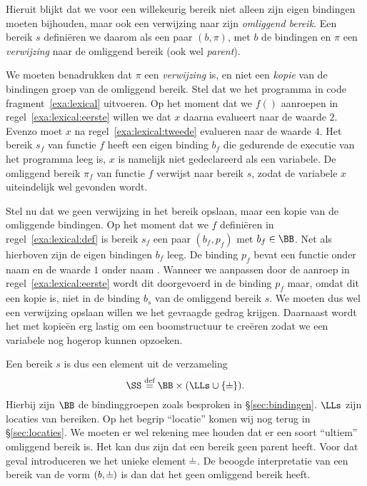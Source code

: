Hieruit blijkt dat we voor een willekeurig bereik niet alleen zijn eigen bindingen moeten bijhouden, maar ook een verwijzing naar zijn \emph{omliggend bereik}. Een bereik $s$ definiëren we daarom als een paar $(b, \pi)$, met $b$ de bindingen en $\pi$ een \emph{verwijzing} naar de omliggend bereik (ook wel \emph{parent}).

We moeten benadrukken dat $\pi$ een \emph{verwijzing} is, en niet een \emph{kopie} van de bindingen groep van de omliggend bereik. Stel dat we het programma in code fragment~\ref{exa:lexical} uitvoeren. Op het moment dat we $f()$ aanroepen in regel~\ref{exa:lexical:eerste} willen we dat $x$ daarna evalueert naar de waarde $2$. Evenzo moet $x$ na regel~\ref{exa:lexical:tweede} evalueren naar de waarde $4$. Het bereik $s_f$ van functie $f$ heeft een eigen binding $b_f$ die gedurende de executie van het programma leeg is, $x$ is namelijk niet gedeclareerd als een \LOCAL variabele. De omliggend bereik $\pi_f$ van functie $f$ verwijst naar bereik $s$, zodat de variabele $x$ uiteindelijk wel gevonden wordt.

\begin{NoBreak}
  \codeFragmentCaption
\end{NoBreak}

Stel nu dat we geen verwijzing in het bereik opslaan, maar een kopie van de omliggende bindingen. Op het moment dat we $f$ definiëren in regel~\ref{exa:lexical:def} is bereik $s_f$ een paar $(b_f, p_f)$ met $b_f \in \BB$. Net als hierboven zijn de eigen bindingen $b_f$ leeg. De binding $p_f$ bevat een functie onder naam  en de waarde $1$ onder naam . Wanneer we  aanpassen door de aanroep in regel~\ref{exa:lexical:eerste} wordt dit doorgevoerd in de binding $p_f$ maar, omdat dit een kopie is, niet in de binding $b_s$ van de omliggend bereik $s$. We moeten dus wel een verwijzing opslaan willen we het gevraagde gedrag krijgen. Daarnaast wordt het met kopieën erg lastig om een boomstructuur te creëren zodat we een variabele nog hogerop kunnen opzoeken.

Een bereik $s$ is dus een element uit de verzameling
%
\begin{equation*}
  \SS \DEF \BB \times (\LLs \cup \{\nil\}).
\end{equation*}
%
Hierbij zijn $\BB$ de bindinggroepen zoals besproken in §\ref{sec:bindingen}. $\LLs$ zijn locaties van bereiken. Op het begrip ``locatie'' komen wij nog terug in §\ref{sec:locaties}. We moeten er wel rekening mee houden dat er een soort ``ultiem'' omliggend bereik is. Het kan dus zijn dat een bereik geen parent heeft. Voor dat geval introduceren we het unieke element $\nil$. De beoogde interpretatie van een bereik van de vorm $(b, \nil)$ is dan dat het geen omliggend bereik heeft.

